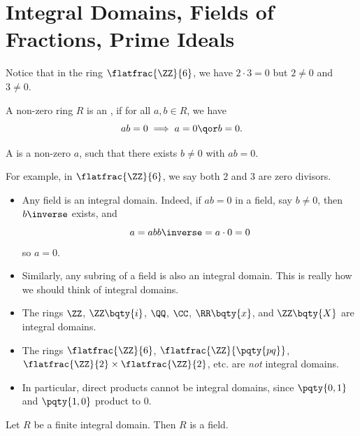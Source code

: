 \section{Integral Domains, Fields of Fractions, Prime Ideals}

Notice that in the ring \(\flatfrac{\ZZ}{6}\), we have \(2 \cdot 3 = 0\) but \(2 \neq 0\) and \(3 \neq 0\).

\begin{definition}
    \label{def:integral-domain-zero-divisor}%
    A non-zero ring \(R\) is an , if for all \(a, b \in R\), we have
    \[
        a b = 0 \implies a = 0 \qor b = 0.
    \]

    A  is a non-zero \(a\), such that there exists \(b \neq 0\) with \(ab = 0\).
\end{definition}

For example, in \(\flatfrac{\ZZ}{6}\), we say both \(2\) and \(3\) are zero divisors.

\begin{examples}
    \label{ex:integral-domain}%
    \begin{itemize}
        \item Any field is an integral domain. Indeed, if \(a b = 0\) in a field, say \(b \neq 0\), then \(b\inverse\) exists, and
    \[
        a = a b b\inverse = a \cdot 0 = 0
    \]
    so \(a = 0\).
        \item Similarly, any subring of a field is also an integral domain. This is really how we should think of integral domains.
        \item The rings \(\ZZ\), \(\ZZ\bqty{i}\), \(\QQ\), \(\CC\), \(\RR\bqty{x}\), and \(\ZZ\bqty{X}\) are integral domains.
        \item The rings \(\flatfrac{\ZZ}{6}\), \(\flatfrac{\ZZ}{\pqty{pq}}\), \(\flatfrac{\ZZ}{2} \times \flatfrac{\ZZ}{2}\), etc. are \textit{not} integral domains.
        \item In particular, direct products cannot be integral domains, since \(\pqty{0, 1}\) and \(\pqty{1, 0}\) product to \(0\).
    \end{itemize}
\end{examples}

\begin{lemma}
    \label{lem:finite-integral-domain-finate-field}%
    Let \(R\) be a finite integral domain. Then \(R\) is a field.
\end{lemma}

